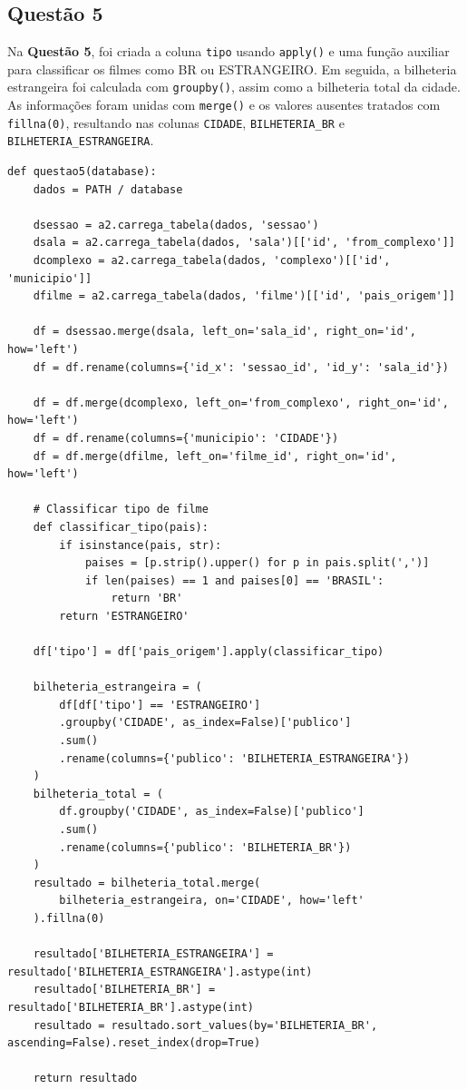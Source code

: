 \documentclass{article}
\begin{document}
\subsection*{Questão 5}
\linespread{1.5}
Na \textbf{Questão 5}, foi criada a coluna \texttt{tipo} usando \texttt{apply()} e uma função auxiliar para classificar os filmes como BR ou ESTRANGEIRO. Em seguida, a bilheteria estrangeira foi calculada com \texttt{groupby()}, assim como a bilheteria total da cidade. As informações foram unidas com \texttt{merge()} e os valores ausentes tratados com \texttt{fillna(0)}, resultando nas colunas \texttt{CIDADE}, \texttt{BILHETERIA\_BR} e \texttt{BILHETERIA\_ESTRANGEIRA}.
\linespread{1}
\begin{lstlisting}
def questao5(database):
    dados = PATH / database

    dsessao = a2.carrega_tabela(dados, 'sessao')
    dsala = a2.carrega_tabela(dados, 'sala')[['id', 'from_complexo']]
    dcomplexo = a2.carrega_tabela(dados, 'complexo')[['id', 'municipio']]
    dfilme = a2.carrega_tabela(dados, 'filme')[['id', 'pais_origem']]

    df = dsessao.merge(dsala, left_on='sala_id', right_on='id', how='left')
    df = df.rename(columns={'id_x': 'sessao_id', 'id_y': 'sala_id'})

    df = df.merge(dcomplexo, left_on='from_complexo', right_on='id', how='left')
    df = df.rename(columns={'municipio': 'CIDADE'})
    df = df.merge(dfilme, left_on='filme_id', right_on='id', how='left')

    # Classificar tipo de filme
    def classificar_tipo(pais):
        if isinstance(pais, str):
            paises = [p.strip().upper() for p in pais.split(',')]
            if len(paises) == 1 and paises[0] == 'BRASIL':
                return 'BR'
        return 'ESTRANGEIRO'

    df['tipo'] = df['pais_origem'].apply(classificar_tipo)

    bilheteria_estrangeira = (
        df[df['tipo'] == 'ESTRANGEIRO']
        .groupby('CIDADE', as_index=False)['publico']
        .sum()
        .rename(columns={'publico': 'BILHETERIA_ESTRANGEIRA'})
    )
    bilheteria_total = (
        df.groupby('CIDADE', as_index=False)['publico']
        .sum()
        .rename(columns={'publico': 'BILHETERIA_BR'})
    )
    resultado = bilheteria_total.merge(
        bilheteria_estrangeira, on='CIDADE', how='left'
    ).fillna(0)

    resultado['BILHETERIA_ESTRANGEIRA'] = resultado['BILHETERIA_ESTRANGEIRA'].astype(int)
    resultado['BILHETERIA_BR'] = resultado['BILHETERIA_BR'].astype(int)
    resultado = resultado.sort_values(by='BILHETERIA_BR', ascending=False).reset_index(drop=True)

    return resultado

\end{lstlisting}
\end{document}

